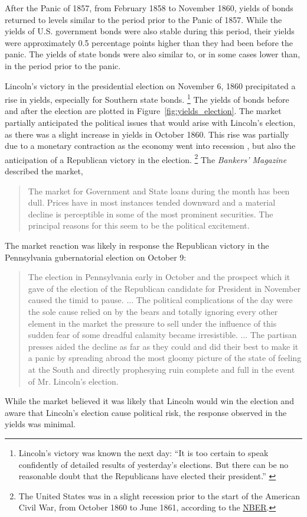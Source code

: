 \documentclass[]{article}\usepackage[]{graphicx}\usepackage[]{color}
\begin{document}
After the Panic of 1857, from February 1858 to November 1860, yields of bonds returned to levels similar to the period prior to the Panic of 1857.
While the yields of U.S. government bonds were also stable during this period, their yields were approximately 0.5 percentage points higher than they had been before the panic.
The yields of state bonds were also similar to, or in some cases lower than, in the period prior to the panic.

Lincoln's victory in the presidential election on November 6, 1860 precipitated a rise in yields, especially for Southern state bonds.%
\footnote{Lincoln's victory was known the next day: ``It is too certain to speak confidently of detailed results of yesterday's elections. But there can be no reasonable doubt that the Republicans have elected their president.'' \parencite{NYT1860}}
The yields of bonds before and after the election are plotted in Figure~\ref{fig:yields_election}.
The market partially anticipated the political issues that would arise with Lincoln's election, as there was a slight increase in yields in October 1860.
This rise was partially due to a monetary contraction as the economy went into recession \parencite[413]{BankersMagazine1860}, but also the anticipation of a Republican victory in the election.%
\footnote{The United States was in a slight recession prior to the start of the American Civil War, from October 1860 to June 1861, according to the  \href{http://www.nber.org/cycles/cyclesmain.html}{NBER}.}
The \textit{Bankers' Magazine} described the market,
\begin{quote}
   The market for Government and State loans during the month has been dull.
   Prices have in most instances tended downward and a material decline is perceptible in some of the most prominent securities.
   The principal reasons for this seem to be the political excitement.  \parencite[414]{BankersMagazine1860}
\end{quote}
The market reaction was likely in response the Republican victory in the Pennsylvania gubernatorial election on October 9:
\begin{quote}
  The election in Pennsylvania early in October and the prospect which it gave of the election of the Republican candidate for President in November caused the timid to pause. ...
  The political complications of the day were the sole cause relied on by the bears and totally ignoring every other element in the market the pressure to sell under the influence of this sudden fear of some dreadful calamity became irresistible. ...
  The partisan presses aided the decline as far as they could and did their best to make it a panic by spreading abroad the most gloomy picture of the state of feeling at the South and directly prophesying ruin complete and full in the event of Mr. Lincoln's election.
  \parencites[476-77]{BankersMagazine1860}
\end{quote}
While the market believed it was likely that Lincoln would win the election and aware that Lincoln's election cause political risk, the  response observed in the yields was minimal.
\end{document}
